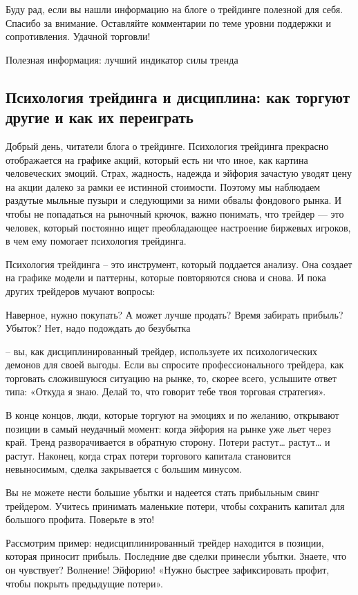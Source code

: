 \documentclass[a5paper]{article}
\begin{document}
Буду рад, если вы нашли информацию на блоге о трейдинге полезной для себя. Спасибо за внимание. Оставляйте комментарии по теме уровни поддержки и сопротивления. Удачной торговли!

Полезная информация: лучший индикатор силы тренда

\subsection{Психология трейдинга и дисциплина: как торгуют другие и
  как их переиграть}

Добрый день, читатели блога о трейдинге. Психология трейдинга прекрасно отображается на графике акций, который есть ни что иное, как картина человеческих эмоций. Страх, жадность, надежда и эйфория зачастую уводят цену на акции далеко за рамки ее истинной стоимости. Поэтому мы наблюдаем раздутые мыльные пузыри и следующими за ними обвалы фондового рынка. И чтобы не попадаться на рыночный крючок, важно понимать, что трейдер — это человек, который постоянно ищет преобладающее настроение биржевых игроков, в чем ему помогает психология трейдинга.

Психология трейдинга – это инструмент, который поддается анализу. Она создает на графике модели и паттерны, которые повторяются снова и снова. И пока других трейдеров мучают вопросы:

    Наверное, нужно покупать?
    А может лучше продать?
    Время забирать прибыль?
    Убыток? Нет, надо подождать до безубытка

– вы, как дисциплинированный трейдер, используете их психологических демонов для своей выгоды. Если вы спросите профессионального трейдера, как торговать сложившуюся ситуацию на рынке, то, скорее всего, услышите ответ типа: «Откуда я знаю. Делай то, что говорит тебе твоя торговая стратегия».

В конце концов, люди, которые торгуют на эмоциях и по желанию, открывают позиции в самый неудачный момент: когда эйфория на рынке уже льет через край. Тренд разворачивается в обратную сторону. Потери растут… растут… и растут. Наконец, когда страх потери торгового капитала становится невыносимым, сделка закрывается с большим минусом.

Вы не можете нести большие убытки и надеется стать прибыльным свинг трейдером. Учитесь принимать маленькие потери, чтобы сохранить капитал для большого профита. Поверьте в это!

Рассмотрим пример: недисциплинированный трейдер находится в позиции, которая приносит прибыль. Последние две сделки принесли убытки. Знаете, что он чувствует? Волнение! Эйфорию! «Нужно быстрее зафиксировать профит, чтобы покрыть предыдущие потери».
\end{document}
